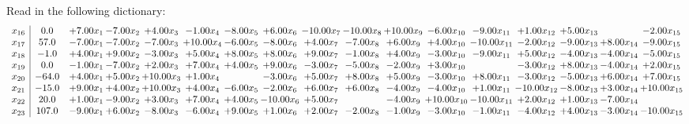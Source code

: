 \documentclass[9pt]{article}
\begin{document}
Read in the following dictionary:
\[\begin{array}{c| c c@{\hskip 2pt} c@{\hskip 2pt} c@{\hskip 2pt} c@{\hskip 2pt} c@{\hskip 2pt} c@{\hskip 2pt} c@{\hskip 2pt} c@{\hskip 2pt} c@{\hskip 2pt} c@{\hskip 2pt} c@{\hskip 2pt} c@{\hskip 2pt} c@{\hskip 2pt} c@{\hskip 2pt} c@{\hskip 2pt} }
 x_{16}   &  0.0 & +  7.00 x_{1} & -7.00 x_{2} & +  4.00 x_{3} & -1.00 x_{4} & -8.00 x_{5} & +  6.00 x_{6} & -10.00 x_{7} & -10.00 x_{8} & + 10.00 x_{9} & -6.00 x_{10} & -9.00 x_{11} & +  1.00 x_{12} & +  5.00 x_{13} &   & -2.00 x_{15}\\
 x_{17}   &  57.0 & -7.00 x_{1} & -7.00 x_{2} & -7.00 x_{3} & + 10.00 x_{4} & -6.00 x_{5} & -8.00 x_{6} & +  4.00 x_{7} & -7.00 x_{8} & +  6.00 x_{9} & +  4.00 x_{10} & -10.00 x_{11} & -2.00 x_{12} & -9.00 x_{13} & +  8.00 x_{14} & -9.00 x_{15}\\
 x_{18}   &  -1.0 & +  4.00 x_{1} & +  9.00 x_{2} & -3.00 x_{3} & +  5.00 x_{4} & +  8.00 x_{5} & +  8.00 x_{6} & +  9.00 x_{7} & -1.00 x_{8} & +  4.00 x_{9} & -3.00 x_{10} & -9.00 x_{11} & +  5.00 x_{12} & -4.00 x_{13} & -4.00 x_{14} & -5.00 x_{15}\\
 x_{19}   &  0.0 & -1.00 x_{1} & -7.00 x_{2} & +  2.00 x_{3} & +  7.00 x_{4} & +  4.00 x_{5} & +  9.00 x_{6} & -3.00 x_{7} & -5.00 x_{8} & -2.00 x_{9} & +  3.00 x_{10} &   & -3.00 x_{12} & +  8.00 x_{13} & -4.00 x_{14} & +  2.00 x_{15}\\
 x_{20}   &  -64.0 & +  4.00 x_{1} & +  5.00 x_{2} & + 10.00 x_{3} & +  1.00 x_{4} &   & -3.00 x_{6} & +  5.00 x_{7} & +  8.00 x_{8} & +  5.00 x_{9} & -3.00 x_{10} & +  8.00 x_{11} & -3.00 x_{12} & -5.00 x_{13} & +  6.00 x_{14} & +  7.00 x_{15}\\
 x_{21}   &  -15.0 & +  9.00 x_{1} & +  4.00 x_{2} & + 10.00 x_{3} & +  4.00 x_{4} & -6.00 x_{5} & -2.00 x_{6} & +  6.00 x_{7} & +  6.00 x_{8} & -4.00 x_{9} & -4.00 x_{10} & +  1.00 x_{11} & -10.00 x_{12} & -8.00 x_{13} & +  3.00 x_{14} & + 10.00 x_{15}\\
 x_{22}   &  20.0 & +  1.00 x_{1} & -9.00 x_{2} & +  3.00 x_{3} & +  7.00 x_{4} & +  4.00 x_{5} & -10.00 x_{6} & +  5.00 x_{7} &   & -4.00 x_{9} & + 10.00 x_{10} & -10.00 x_{11} & +  2.00 x_{12} & +  1.00 x_{13} & -7.00 x_{14} &   \\
 x_{23}   &  107.0 & -9.00 x_{1} & +  6.00 x_{2} & -8.00 x_{3} & -6.00 x_{4} & +  9.00 x_{5} & +  1.00 x_{6} & +  2.00 x_{7} & -2.00 x_{8} & -1.00 x_{9} & -3.00 x_{10} & -1.00 x_{11} & -4.00 x_{12} & +  4.00 x_{13} & -3.00 x_{14} & -10.00 x_{15}\\

\end{array}\]
\end{document}
